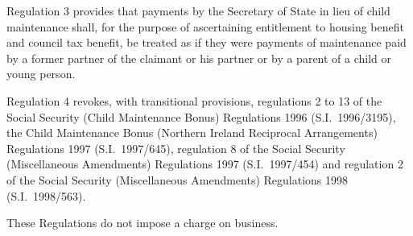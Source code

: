 \documentclass[12pt,a4paper]{article}
\begin{document}
Regulation 3 provides that payments by the Secretary of State in lieu of child maintenance shall, for the purpose of ascertaining entitlement to housing benefit and council tax benefit, be treated as if they were payments of maintenance paid by a former partner of the claimant or his partner or by a parent of a child or young person.

Regulation 4 revokes, with transitional provisions, regulations 2 to 13 of the Social Security (Child Maintenance Bonus) Regulations 1996 (S.I.\ 1996/3195), the Child Maintenance Bonus (Northern Ireland Reciprocal Arrangements) Regulations 1997 (S.I.\ 1997/645), regulation 8 of the Social Security (Miscellaneous Amendments) Regulations 1997 (S.I.\ 1997/454) and regulation 2 of the Social Security (Miscellaneous Amendments) Regulations 1998 (S.I.\ 1998/563).

These Regulations do not impose a charge on business.  
\end{document}
